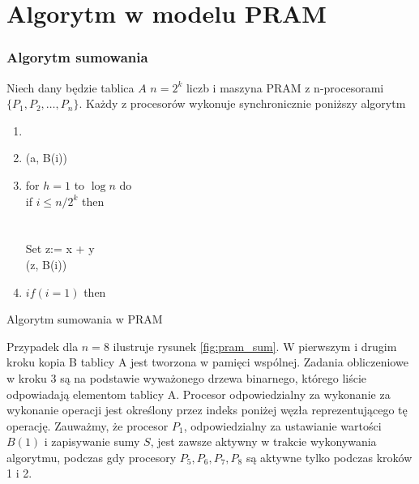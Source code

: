 \section{Algorytm w modelu PRAM}
\subsubsection{Algorytm sumowania}
Niech dany będzie tablica \(A\) \(n=2^k\) liczb i maszyna PRAM z n-procesorami \(\{P_1, P_2, \dots, P_n\}\). Każdy z procesorów wykonuje synchronicznie poniższy algorytm

\label{alg:crew_pram_sum}
\begin{algorithm}[H]
\begin{enumerate}
 \item {}
 \item \Gwrite(a, B(i))
 \item for \(h = 1\) to \( \log{n}\) do\\
	 if \(i \leq n/2^k\) then\\
	 \\
	 \\
	 Set z:= x + y\\
	 \Gwrite(z, B(i))\\
 \item \(if(i=1)\) then 
\end{enumerate}
\caption{Algorytm sumowania w PRAM\label{alg:pram_sum}}
\end{algorithm}

Przypadek dla \(n=8\) ilustruje rysunek \ref{fig:pram_sum}. W pierwszym i drugim kroku kopia B tablicy A jest tworzona w pamięci wspólnej. 
Zadania obliczeniowe w kroku 3 są na podstawie wyważonego drzewa binarnego, którego liście odpowiadają elementom tablicy A. Procesor odpowiedzialny za wykonanie za wykonanie operacji jest określony przez indeks poniżej węzła reprezentującego tę operację. Zauważmy, że procesor \(P_1\), odpowiedzialny za ustawianie wartości \(B(1)\) i zapisywanie sumy \(S\), jest zawsze aktywny w trakcie wykonywania algorytmu, podczas gdy procesory \(P_5, P_6, P_7, P_8\) są aktywne tylko podczas kroków 1 i 2.

